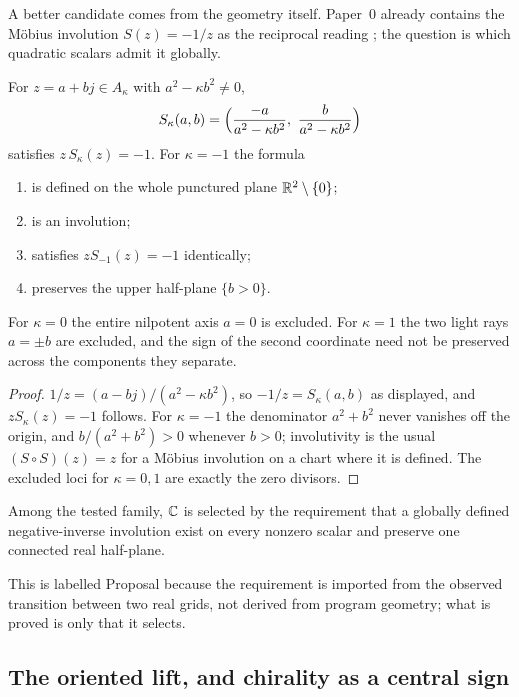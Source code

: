 A better candidate comes from the geometry itself.  Paper~0 already contains the
M\"obius involution $S(z)=-1/z$ as the reciprocal reading
\cite{Yuan2026AEGPaperZero}; the question is which quadratic scalars admit it
globally.

\begin{proposition}\label{prop:negative-inverse}
For $z=a+bj\in A_\kappa$ with $a^{2}-\kappa b^{2}\neq0$,
\[
  S_\kappa(a,b)=\Bigl(\frac{-a}{a^{2}-\kappa b^{2}},\ \frac{b}{a^{2}-\kappa b^{2}}\Bigr)
\]
satisfies $z\,S_\kappa(z)=-1$.  For $\kappa=-1$ the formula
\begin{enumerate}
\item is defined on the whole punctured plane $\mathbb{R}^{2}\setminus\{0\}$;
\item is an involution;
\item satisfies $zS_{-1}(z)=-1$ identically;
\item preserves the upper half-plane $\{b>0\}$.
\end{enumerate}
For $\kappa=0$ the entire nilpotent axis $a=0$ is excluded.  For $\kappa=1$ the two
light rays $a=\pm b$ are excluded, and the sign of the second coordinate need not be
preserved across the components they separate.
\end{proposition}

\begin{proof}
$1/z=(a-bj)/(a^{2}-\kappa b^{2})$, so $-1/z=S_\kappa(a,b)$ as displayed, and
$zS_\kappa(z)=-1$ follows.  For $\kappa=-1$ the denominator $a^{2}+b^{2}$ never
vanishes off the origin, and $b/(a^{2}+b^{2})>0$ whenever $b>0$; involutivity is the
usual $(S\circ S)(z)=z$ for a M\"obius involution on a chart where it is defined.  The
excluded loci for $\kappa=0,1$ are exactly the zero divisors.
\end{proof}

\begin{proposal}\label{prop:inversion-criterion}
Among the tested family, $\mathbb{C}$ is selected by the requirement that a globally defined
negative-inverse involution exist on every nonzero scalar and preserve one connected
real half-plane.
\end{proposal}

This is labelled \textsf{Proposal} because the requirement is imported from the
observed transition between two real grids, not derived from program geometry; what
is proved is only that it selects.

\subsection{The oriented lift, and chirality as a central sign}

